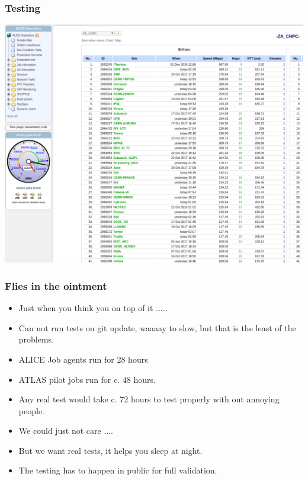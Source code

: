 \documentclass{beamer}
\begin{document}
\begin{frame}
    \frametitle{Testing}
    \includegraphics[scale=0.35]{BandwidthTests.pdf}
\end{frame}

\begin{frame}
    \frametitle{Flies in the ointment}
    \begin{itemize}
            \item <1->Just when you think you on top of it .....
                \item <2-> Can not run tests on git update, waaaay to slow, but that is the least of the problems.
                    \item <3-> ALICE Job agents run for 28 hours
                        \item <4-> ATLAS pilot jobs run for c. 48 hours.
                            \item <5-> Any real test would take c. 72 hours to test properly with out annoying people.
                                \item <6-> We could just not care ....
                                    \item <7-> But we want real tests, it helps you sleep at night.
                                    \item <8-> The testing has to happen in public for full validation.
    \end{itemize}
\end{frame}
\end{document}
